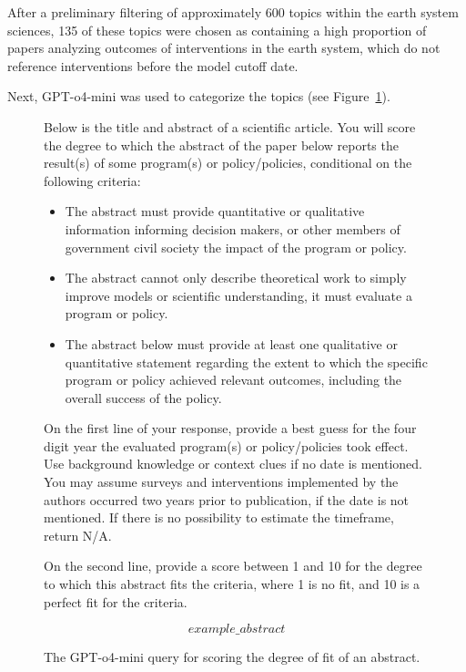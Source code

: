 \documentclass[12pt,a4paper]{article}
\begin{document}
After a preliminary filtering of approximately 600 topics within the earth system sciences, 135 of these topics were chosen as containing a high proportion of papers analyzing outcomes of interventions in the earth system, which do not reference interventions before the model cutoff date. 

Next, GPT-o4-mini was used to categorize the topics (see Figure~\ref{fig:scoringfigure}).

\begin{figure}[htbp]
  \centering
  \begin{tcolorbox}[left=4pt, right=4pt, top=4pt, bottom=4pt]
\ttfamily\footnotesize
Below is the title and abstract of a scientific article. 
You will score the degree to which the abstract of the paper below reports the result(s) of some program(s) or policy/policies, conditional on the following criteria: 

\begin{itemize}
 \item The abstract must provide quantitative or qualitative information informing decision makers, or other members of government civil society the impact of the program or policy. 
 \item The abstract cannot only describe theoretical work to simply improve models or scientific understanding, it must evaluate a program or policy. 
 \item The abstract below must provide at least one qualitative or quantitative statement regarding the extent to which the specific program or policy achieved relevant outcomes, including the overall success of the policy.  
\end{itemize}
On the first line of your response, provide a best guess for the four digit year the evaluated program(s) or policy/policies took effect. Use background knowledge or context clues if no date is mentioned. You may assume surveys and interventions implemented by the authors occurred two years prior to publication, if the date is not mentioned. If there is no possibility to estimate the timeframe, return N/A.

On the second line, provide a score between 1 and 10 for the degree to which this abstract fits the criteria, where 1 is no fit, and 10 is a perfect fit for the criteria.

\[example\_abstract\]
  \end{tcolorbox}
  \caption{The GPT-o4-mini query for scoring the degree of fit of an abstract.}
  \label{fig:scoringfigure}
\end{figure}
\end{document}
